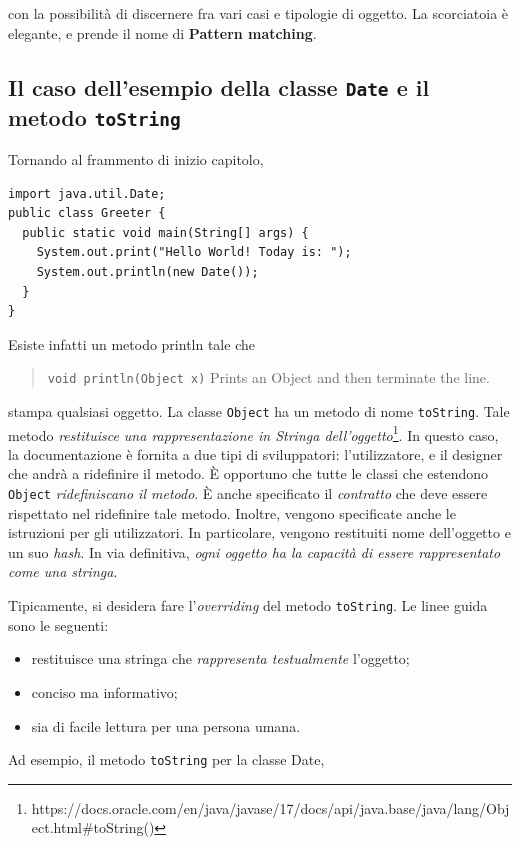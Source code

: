 \documentclass[\fontsizeclass,twocolumn]{\classname}
\theoremstyle{definition}
\theoremstyle{definition}
\begin{document}
con la possibilità di discernere fra vari casi e tipologie di oggetto. La
scorciatoia è elegante, e prende il nome di \textbf{Pattern matching}.

\subsection{Il caso dell'esempio della classe \texttt{Date} e il metodo \texttt{toString}}

Tornando al frammento di inizio capitolo,

\begin{lstlisting}
import java.util.Date;
public class Greeter {
  public static void main(String[] args) {
    System.out.print("Hello World! Today is: ");
    System.out.println(new Date());
  }
}
\end{lstlisting}

Esiste infatti un metodo println tale che
\begin{quote}
    \footnotesize{\texttt{void	println(Object x)}	Prints an Object and then terminate the line.}
\end{quote}
stampa qualsiasi oggetto. La classe \texttt{Object} ha un metodo di nome
\texttt{toString}. Tale metodo \emph{restituisce una rappresentazione in Stringa
dell'oggetto}\footnote{https://docs.oracle.com/en/java/javase/17/docs/api/java.base/java/lang/Object.html\#toString()}. 
In questo caso, la documentazione è fornita a due tipi di sviluppatori:
l'utilizzatore, e il designer che andrà a ridefinire il metodo. È opportuno che
tutte le classi che estendono \texttt{Object} \emph{ridefiniscano il metodo}. È anche
specificato il \emph{contratto} che deve essere rispettato nel ridefinire tale
metodo. Inoltre, vengono specificate anche le istruzioni per gli utilizzatori.
In particolare, vengono restituiti nome dell'oggetto e un suo \emph{hash}.
In via definitiva, \emph{ogni oggetto ha la capacità di essere rappresentato
come una stringa}.

Tipicamente, si desidera fare l'\emph{overriding} del metodo \texttt{toString}.
Le linee guida sono le seguenti: 
\begin{itemize}
  \item restituisce una stringa che \emph{rappresenta testualmente} l'oggetto;
  \item conciso ma informativo;
  \item sia di facile lettura per una persona umana.
\end{itemize}

Ad esempio, il metodo \texttt{toString} per la classe Date,
\end{document}
